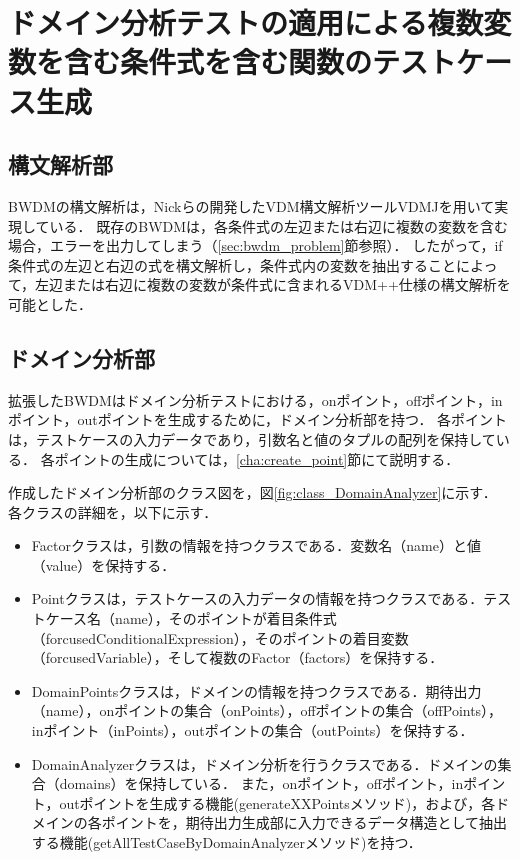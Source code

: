 \documentclass[uplatex, report, a4j, 10pt]{jsbook}
\begin{document}
\section{ドメイン分析テストの適用による複数変数を含む条件式を含む関数のテストケース生成}

\subsection{構文解析部}
BWDMの構文解析は，Nickらの開発したVDM構文解析ツールVDMJを用いて実現している\cite{vdmj}．
既存のBWDMは，各条件式の左辺または右辺に複数の変数を含む場合，エラーを出力してしまう（\ref{sec:bwdm_problem}節参照）．
したがって，if条件式の左辺と右辺の式を構文解析し，条件式内の変数を抽出することによって，左辺または右辺に複数の変数が条件式に含まれるVDM++仕様の構文解析を可能とした．

\subsection{ドメイン分析部}\label{cha:DomainAnalyzer}
拡張したBWDMはドメイン分析テストにおける，onポイント，offポイント，inポイント，outポイントを生成するために，ドメイン分析部を持つ．
各ポイントは，テストケースの入力データであり，引数名と値のタプルの配列を保持している．
各ポイントの生成については，\ref{cha:create_point}節にて説明する．

作成したドメイン分析部のクラス図を，図\ref{fig:class_DomainAnalyzer}に示す．
各クラスの詳細を，以下に示す．

\begin{itemize}
	\item
	Factorクラスは，引数の情報を持つクラスである．変数名（name）と値（value）を保持する．
	\item
	Pointクラスは，テストケースの入力データの情報を持つクラスである．テストケース名（name），そのポイントが着目条件式（forcusedConditionalExpression），そのポイントの着目変数（forcusedVariable），そして複数のFactor（factors）を保持する．
	\item
	DomainPointsクラスは，ドメインの情報を持つクラスである．期待出力（name），onポイントの集合（onPoints），offポイントの集合（offPoints），inポイント（inPoints），outポイントの集合（outPoints）を保持する．
	\item
	DomainAnalyzerクラスは，ドメイン分析を行うクラスである．ドメインの集合（domains）を保持している．
	また，onポイント，offポイント，inポイント，outポイントを生成する機能(generateXXPointsメソッド)，および，各ドメインの各ポイントを，期待出力生成部に入力できるデータ構造として抽出する機能(getAllTestCaseByDomainAnalyzerメソッド)を持つ．

\end{itemize}
\end{document}
